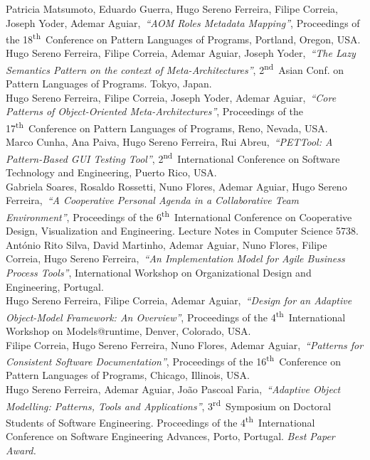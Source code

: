 \documentclass[9pt, a4paper]{article}
\newcommand{\current}{{\hspace{-0.97em}\color{feup}$\star$}~}
\newcommand{\years}[1]{\marginnote{\small #1}}
\newcommand{\nth}{\textsuperscript{th}~}
\newcommand{\nd}{\textsuperscript{nd}~}
\newcommand{\rd}{\textsuperscript{rd}~}
\begin{document}
\years{2011}Patricia Matsumoto, Eduardo Guerra, Hugo Sereno Ferreira, Filipe Correia, Joseph Yoder, Ademar Aguiar,~\emph{``AOM Roles Metadata Mapping''}, Proceedings of the 18\nth Conference on Pattern Languages of Programs, Portland, Oregon, USA.\\
\years{2011}Hugo Sereno Ferreira, Filipe Correia, Ademar Aguiar, Joseph Yoder,~\emph{``The Lazy Semantics Pattern on the context of Meta-Architectures''}, 2\nd Asian Conf. on Pattern Languages of Programs. Tokyo, Japan.\\
\years{2010}Hugo Sereno Ferreira, Filipe Correia, Joseph Yoder, Ademar Aguiar,~\emph{``Core Patterns of Object-Oriented Meta-Architectures''}, Proceedings of the 17\nth Conference on Pattern Languages of Programs, Reno, Nevada, USA.\\
\years{2010}Marco Cunha, Ana Paiva, Hugo Sereno Ferreira, Rui Abreu,~\emph{``PETTool: A Pattern-Based GUI Testing Tool''}, 2\nd International Conference on Software Technology and Engineering, Puerto Rico, USA.\\
\years{2009}Gabriela Soares, Rosaldo Rossetti, Nuno Flores, Ademar Aguiar, Hugo Sereno Ferreira,~\emph{``A Cooperative Personal Agenda in a Collaborative Team Environment''}, Proceedings of the 6\nth International Conference on Cooperative Design, Visualization and Engineering. Lecture Notes in Computer Science 5738.\\
\years{2009}António Rito Silva, David Martinho, Ademar Aguiar, Nuno Flores, Filipe Correia, Hugo Sereno Ferreira,~\emph{``An Implementation Model for Agile Business Process Tools''}, International Workshop on Organizational Design and Engineering, Portugal.\\
\years{2009}Hugo Sereno Ferreira, Filipe Correia, Ademar Aguiar,~\emph{``Design for an Adaptive Object-Model Framework: An Overview''}, Proceedings of the 4\nth International Workshop on Models@runtime, Denver, Colorado, USA.\\
\years{2009}Filipe Correia, Hugo Sereno Ferreira, Nuno Flores, Ademar Aguiar,~\emph{``Patterns for Consistent Software Documentation''}, Proceedings of the 16\nth Conference on Pattern Languages of Programs, Chicago, Illinois, USA.\\
\years{\current~2009}Hugo Sereno Ferreira, Ademar Aguiar, João Pascoal Faria,~\emph{``Adaptive Object Modelling: Patterns, Tools and Applications''}, 3\rd Symposium on Doctoral Students of Software Engineering. Proceedings of the 4\nth International Conference on Software Engineering Advances, Porto, Portugal. {\color{feup} \emph{Best Paper Award.}}\\
\end{document}
